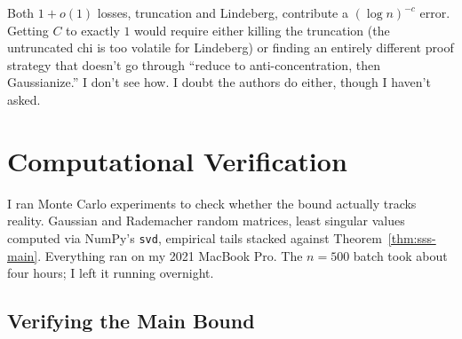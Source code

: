 \documentclass[11pt]{article}
\theoremstyle{definition}
\theoremstyle{remark}
\begin{document}
\begin{center}
\end{center}

Both $1 + o(1)$ losses, truncation and Lindeberg, contribute a $(\log n)^{-c}$ error.
Getting $C$ to exactly $1$ would require either killing the truncation (the untruncated chi is too volatile for Lindeberg) or finding an entirely different proof strategy that doesn't go through ``reduce to anti-concentration, then Gaussianize.''
I don't see how. I doubt the authors do either, though I haven't asked.

\section{Computational Verification}
\label{sec:experiments}

I ran Monte Carlo experiments to check whether the bound actually tracks reality.
Gaussian and Rademacher random matrices, least singular values computed via NumPy's \texttt{svd}, empirical tails stacked against Theorem~\ref{thm:sss-main}.
Everything ran on my 2021 MacBook Pro. The $n = 500$ batch took about four hours; I left it running overnight.

\subsection{Verifying the Main Bound}
\end{document}
